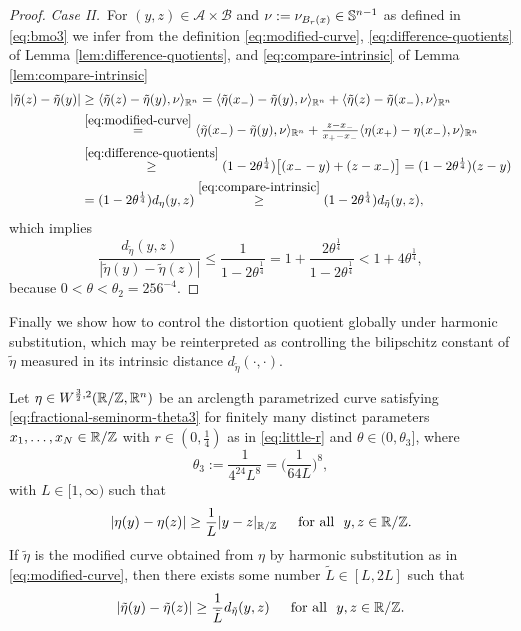 \begin{proof}
\noindent
{\it Case II.}\,
For $(y,z)\in \mathcal{A}\times \mathcal{B}$ 
and $\nu:=\nu_{B_r(x)}\in\S^{n-1}$ as defined 
in \eqref{eq:bmo3} we infer from the definition \eqref{eq:modified-curve},
\eqref{eq:difference-quotients} of
Lemma \ref{lem:difference-quotients}, 
and \eqref{eq:compare-intrinsic} of Lemma
\ref{lem:compare-intrinsic}
\begin{align*}
\textstyle
|\tilde{\eta}(z)-\tilde{\eta}(y)|& 
\textstyle
\ge
\langle\tilde{\eta}(z)-\tilde{\eta}(y),\nu\rangle_{\R^n}=
\langle\tilde{\eta}(x_-)-\tilde{\eta}(y),\nu\rangle_{\R^n}+
\langle\tilde{\eta}(z)-\tilde{\eta}(x_-),\nu\rangle_{\R^n}\\
&\overset{\eqref{eq:modified-curve}}{=}\textstyle
\langle\tilde{\eta}(x_-)-\tilde{\eta}(y),\nu\rangle_{\R^n}+
\frac{z-x_-}{x_+-x_-}\langle\eta(x_+)-\eta(x_-),\nu\rangle_{\R^n}\\
&\overset{\eqref{eq:difference-quotients}}{\ge}
\textstyle
(1-2\theta^\frac14)\big[(x_--y)+(z-x_-)\big]=
(1-2\theta^\frac14)(z-y)\\
&\textstyle =(1-2\theta^\frac14)d_\eta(y,z)\overset{\eqref{eq:compare-intrinsic}}{\ge}(1-2\theta^\frac14)d_{\tilde{\eta}}(y,z),
\end{align*}
which implies
$$
\textstyle
\frac{d_{\tilde{\eta}}(y,z)}{|\tilde{\eta}(y)-\tilde{\eta}(z)|}
\le\frac1{1-2\theta^\frac14}=1+\frac{2\theta^\frac14}{1-2\theta^\frac14}<
1+4\theta^\frac14,
$$
because $0<\theta<\theta_2=256^{-4}.$
\end{proof}
Finally we show how to control the distortion quotient globally
under harmonic substitution, which may be reinterpreted as
controlling the bilipschitz constant of $\tilde{\eta}$ measured
in its intrinsic distance $d_{\tilde{\eta}}(\cdot,\cdot)$.
\begin{lemma}
\label{lem:bilip-control-harmonic}
Let $\eta\in W^{\frac32,2}(\R/\Z,\R^n)$ be an arclength parametrized
curve satisfying \eqref{eq:fractional-seminorm-theta3} for finitely
many distinct parameters $x_1,\ldots,x_N\in\R/\Z$ with
$r\in (0,\frac14)$ as in \eqref{eq:little-r} and $\theta\in (0,\theta_3]$,
where
\begin{equation}\label{eq:theta3}
\theta_3:=\frac1{4^{24}L^8}=\big(\frac1{64L}\big)^8,
\end{equation}
with $L\in [1,\infty)$ such that
\begin{equation}\label{eq:bilip-eta}
|\eta(y)-\eta(z)|\ge\frac1{L}|y-z|_{\R/\Z}\quad\Foa y,z\in\R/\Z.
\end{equation}
If $\tilde{\eta}$ is the modified curve obtained from $\eta$ by
harmonic substitution as in \eqref{eq:modified-curve}, then
there exists some number $\tilde{L}\in [L,2L]$ such that
\begin{equation}\label{eq:bilip-tilde-eta}
|\tilde{\eta}(y)-\tilde{\eta}(z)|\ge\frac1{\tilde{L}}d_{\tilde{\eta}}(y,z)
\quad\Foa y,z\in\R/\Z.
\end{equation}
\end{lemma}
